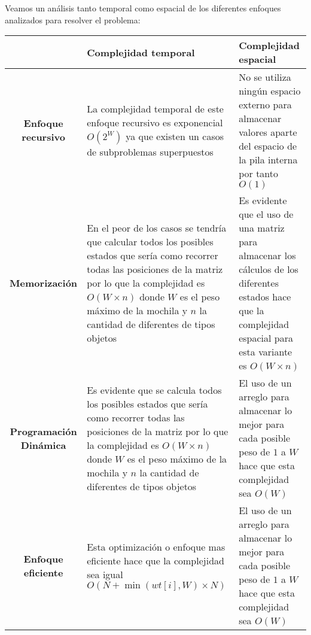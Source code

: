 Veamos un análisis tanto temporal como espacial de los diferentes enfoques analizados para resolver el problema:

\begin{longtable}{|c|p{5.5cm}|p{5.5cm}|}
	\hline
	& \textbf{Complejidad temporal} & \textbf{Complejidad espacial} \\
	\hline
	\textbf{Enfoque recursivo} &  La complejidad temporal de este
	enfoque recursivo es exponencial $O(2^W)$ ya que existen un casos de subproblemas superpuestos &  No se utiliza ningún espacio
	externo para almacenar valores
	aparte del espacio de la pila interna por tanto $O(1)$\\ \hline
	\textbf{Memorización} & En el peor de los casos se tendría que calcular todos los posibles estados que sería como recorrer todas las posiciones de la
	matriz por lo que la complejidad
	es $O(W\times n )$ donde $W$ es el peso máximo de la mochila y $n$ la cantidad de  diferentes de tipos objetos & Es evidente que el uso de una
	matriz para almacenar los cálculos de los diferentes estados hace
	que la complejidad espacial para
esta variante es $O(W\times n )$  \\ \hline
	\textbf{Programación Dinámica} & Es evidente que se calcula todos los posibles estados que sería como recorrer todas las posiciones de la
	matriz por lo que la complejidad
	es $O(W\times n )$ donde $W$ es el peso máximo de la mochila y $n$ la cantidad de  diferentes de tipos objetos  &  El uso de un arreglo para almacenar lo mejor para cada posible peso de $1$ a $W$ hace que esta complejidad sea $O(W)$ \\ \hline
	\textbf{Enfoque eficiente} & Esta optimización o enfoque mas eficiente hace que la complejidad sea igual $O( N + \min(wt[i], W) \times N)$ &  El uso de un arreglo para almacenar lo mejor para cada posible peso de $1$ a $W$ hace que esta complejidad sea $O(W)$ \\ \hline
\end{longtable} 